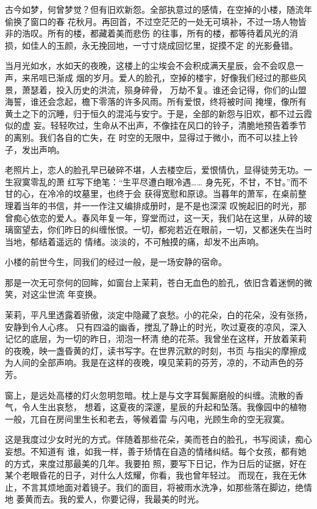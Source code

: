 		古今如梦，何曾梦觉？但有旧欢新怨。全部执意过的感情，在空掉的小楼，随流年偷换了窗口的春
	花秋月。再回首，不过空茫茫的一处无可填补，不过一场人物皆非的浩叹。所有的楼，都藏着美而悲伤
	的往事，所有的楼，都等待着风光的消损，如佳人的玉颜，永无挽回地，一寸寸烧成回忆里，捉摸不定
	的光影叠错。

		当月光如水，水如天的夜晚，这楼上的尘埃会不会积成满天星辰，会不会叹息一声，来吊唁已渐成
	烟的岁月。爱人的脸孔，空掉的楼宇，好像我们经过的那些风景，萧瑟着，投入历史的洪流，殒身碎骨，
	万劫不复。谁还会记得，你们的山盟海誓，谁还会念起，檐下零落的许多风雨。所有爱恨，终将被时间
	掩埋，像所有黄土之下的沉睡，归于恒久的混沌与安宁。于是，全部的新怨与旧欢，都不过云霞似的虚
	妄。轻轻吹过，生命从不出声，不像挂在风口的铃子，清脆地预告着季节的离别。我们各自的亡失，在
	时空的无限中，显得过于微小，而不可以挂上铃子，发出声响。

		老照片上，恋人的脸孔早已破碎不堪，人去楼空后，爱恨情仇，显得徒劳无功。一生寂寞零乱的萧
	红写下绝笔：“生平尽遭白眼冷遇…… 身先死，不甘，不甘。”而不甘的心，在冷冷的坟墓里，也终于会
	获得宽慰和原谅。当暮年的萧军，在桌前整理着当年的书信，并一一作注又编排成册时，是不是也深深
	叹惋起旧的时光，那曾痴心依恋的爱人。春风年复一年，穿堂而过，这一天，我们站在这里，从碎的玻
	璃窗望去，你们昨日的纠缠怅恨。一切，都宛若近在眼前，一切，又都迷失在当时当地，郁结着遥远的
	情绪。淡淡的，不可触摸的痛，却发不出声响。

		小楼的前世今生，同我们的经过一般，是一场安静的宿命。

	\endwriting



		那是一次无可奈何的回眸，如窗台上茉莉，苍白无血色的脸孔，依旧含着迷惘的微笑，对这尘世流
	年变换。

		茉莉，平凡里透露着骄傲，淡定中隐藏了哀愁。小的花朵，白的花朵，没有张扬，安静到令人心疼。
	只有四溢的幽香，搅乱了静止的时光，吹过夏夜的凉风，深入记忆的底层，为一切的昨日，沏泡一杯清
	绝的花茶。我曾坐在这样，开放着茉莉的夜晚，映一盏昏黄的灯，读书写字。在世界沉默的时刻，书页
	与指尖的摩擦成为人间的全部声响。我是在这样的夜晚，嗅见茉莉的芬芳，凉的，不动声色的芬芳。

		窗上，是远处高楼的灯火忽明忽暗。枕上是与文字耳鬓厮磨般的纠缠。流散的香气，令人生出哀愁，
	想着，这夏夜的深邃，星辰的升起和坠落。我像园中的植物一般，兀自在房间里生长和老去，等候着雷
	与闪电，光顾生命的空无寂寞。

		这是我度过少女时光的方式。伴随着那些花朵，美而苍白的脸孔，书写阅读，痴心妄想。不知道有
	谁，如我一样，善于矫情在自造的情绪纠结。每个女孩，都有她的方式，来度过那最美的几年。我要拍
	照，要写下日记，作为日后的证据，好在某个老眼昏花的日子，对什么人炫耀，你看，我也曾年轻过。
	而现在，我在无休止，不言其烦地面对着镜子。我们的面目，将被雨水洗净，如那些落在脚边，绝情地
	萎黄而去。我的爱人，你要记得，我最美的时光。

